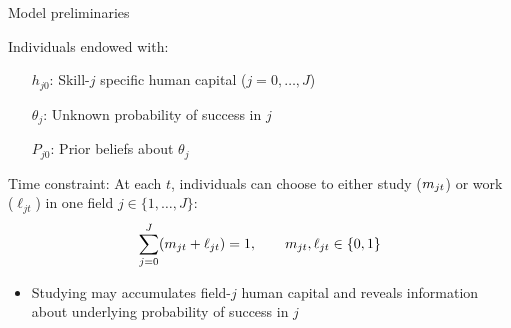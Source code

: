 
\begin{frame}{Model preliminaries}




% 

Individuals endowed with:
\begin{itemize}
    \item [$h_{j0}$:] Skill-$j$ specific human capital ($j=0,\dots,J$)
    \item [$\theta_j$:] Unknown probability of success in $j$
    \item [$P_{j0}$:] Prior beliefs about $\theta_j$
\end{itemize}



\vspace{2ex}
Time constraint: At each $t$, individuals can choose to either study ($m_{jt}$)
or work ($\ell_{jt}$) in one field $j \in \{1, \dots, J\}$:
\begin{equation*}
    \sum_{j=0}^J (m_{jt} + \ell_{jt}) = 1, \quad \quad m_{jt}, \ell_{jt} \in \{0, 1\}
\end{equation*}
\vspace{-2.5ex}
\begin{itemize}
    \item Studying may accumulates field-$j$ human capital and reveals information about underlying probability of success in $j$


\end{itemize}
\end{frame}
